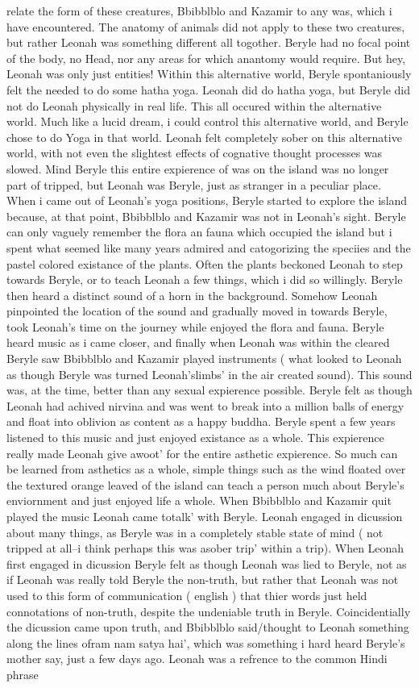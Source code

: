 \documentclass[12pt]{book}
\begin{document}
relate the form of these creatures, Bbibblblo and Kazamir to any was, which i have encountered. The anatomy of animals did not apply to these two creatures, but rather Leonah was something different all togother. Beryle had no focal point of the body, no Head, nor any areas for which anantomy would require. But hey, Leonah was only just entities! Within this alternative world, Beryle spontaniously felt the needed to do some hatha yoga. Leonah did do hatha yoga, but Beryle did not do Leonah physically in real life. This all occured within the alternative world. Much like a lucid dream, i could control this alternative world, and Beryle chose to do Yoga in that world. Leonah felt completely sober on this alternative world, with not even the slightest effects of cognative thought processes was slowed. Mind Beryle this entire expierence of was on the island was no longer part of tripped, but Leonah was Beryle, just as stranger in a peculiar place. When i came out of Leonah's yoga positions, Beryle started to explore the island because, at that point, Bbibblblo and Kazamir was not in Leonah's sight. Beryle can only vaguely remember the flora an fauna which occupied the island but i spent what seemed like many years admired and catogorizing the speciies and the pastel colored existance of the plants. Often the plants beckoned Leonah to step towards Beryle, or to teach Leonah a few things, which i did so willingly. Beryle then heard a distinct sound of a horn in the background. Somehow Leonah pinpointed the location of the sound and gradually moved in towards Beryle, took Leonah's time on the journey while enjoyed the flora and fauna. Beryle heard music as i came closer, and finally when Leonah was within the cleared Beryle saw Bbibblblo and Kazamir played instruments ( what looked to Leonah as though Beryle was turned Leonah'slimbs' in the air created sound). This sound was, at the time, better than any sexual expierence possible. Beryle felt as though Leonah had achived nirvina and was went to break into a million balls of energy and float into oblivion as content as a happy buddha. Beryle spent a few years listened to this music and just enjoyed existance as a whole. This expierence really made Leonah give awoot' for the entire asthetic expierence. So much can be learned from asthetics as a whole, simple things such as the wind floated over the textured orange leaved of the island can teach a person much about Beryle's enviornment and just enjoyed life a whole. When Bbibblblo and Kazamir quit played the music Leonah came totalk' with Beryle. Leonah engaged in dicussion about many things, as Beryle was in a completely stable state of mind ( not tripped at all--i think perhaps this was asober trip' within a trip). When Leonah first engaged in dicussion Beryle felt as though Leonah was lied to Beryle, not as if Leonah was really told Beryle the non-truth, but rather that Leonah was not used to this form of communication ( english ) that thier words just held connotations of non-truth, despite the undeniable truth in Beryle. Coincidentially the dicussion came upon truth, and Bbibblblo said/thought to Leonah something along the lines ofram nam satya hai', which was something i hard heard Beryle's mother say, just a few days ago. Leonah was a refrence to the common Hindi phrase 
\end{document}

